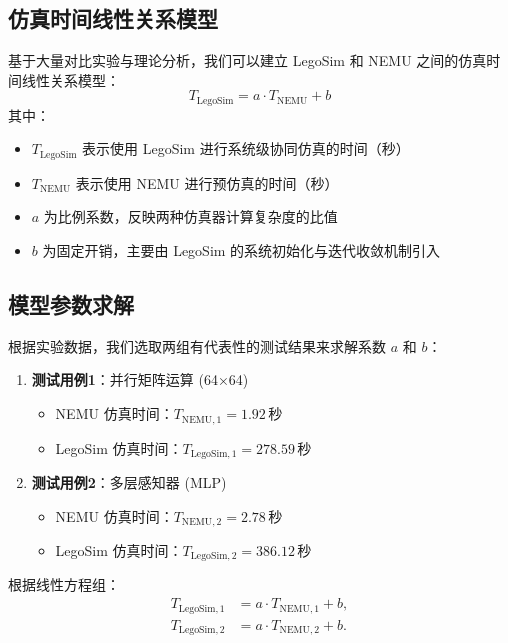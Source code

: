 \documentclass[bachelor]{thesis-uestc}
\begin{document}
    \subsection{仿真时间线性关系模型}
    
    基于大量对比实验与理论分析，我们可以建立 LegoSim 和 NEMU 之间的仿真时间线性关系模型：
    \begin{equation}
    T_{\textrm{LegoSim}} = a \cdot T_{\textrm{NEMU}} + b
    \end{equation}
    其中：
    \begin{itemize}
      \item $T_{\textrm{LegoSim}}$ 表示使用 LegoSim 进行系统级协同仿真的时间（秒）
      \item $T_{\textrm{NEMU}}$ 表示使用 NEMU 进行预仿真的时间（秒）
      \item $a$ 为比例系数，反映两种仿真器计算复杂度的比值
      \item $b$ 为固定开销，主要由 LegoSim 的系统初始化与迭代收敛机制引入
    \end{itemize}
    
    \subsection{模型参数求解}
    
    根据实验数据，我们选取两组有代表性的测试结果来求解系数 $a$ 和 $b$：
    
    \begin{enumerate}
      \item \textbf{测试用例1}：并行矩阵运算 (64×64)
        \begin{itemize}
          \item NEMU 仿真时间：$T_{\textrm{NEMU},1} = 1.92\,$秒
          \item LegoSim 仿真时间：$T_{\textrm{LegoSim},1} = 278.59\,$秒
        \end{itemize}
    
      \item \textbf{测试用例2}：多层感知器 (MLP)
        \begin{itemize}
          \item NEMU 仿真时间：$T_{\textrm{NEMU},2} = 2.78\,$秒
          \item LegoSim 仿真时间：$T_{\textrm{LegoSim},2} = 386.12\,$秒
        \end{itemize}
    \end{enumerate}
    
    根据线性方程组：
    \begin{align}
    T_{\textrm{LegoSim},1} &= a \cdot T_{\textrm{NEMU},1} + b, \\
    T_{\textrm{LegoSim},2} &= a \cdot T_{\textrm{NEMU},2} + b.
    \end{align}
    
\end{document}
